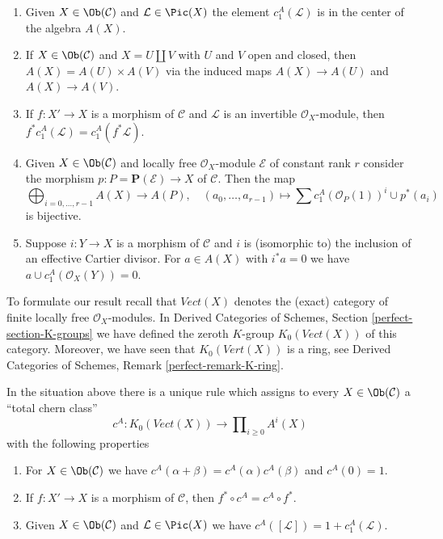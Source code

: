 \begin{enumerate}
\item Given $X \in \Ob(\mathcal{C})$ and $\mathcal{L} \in \Pic(X)$
the element $c_1^A(\mathcal{L})$ is in the center of the algebra $A(X)$.
\item If $X \in \Ob(\mathcal{C})$ and $X = U \amalg V$ with $U$ and $V$
open and closed, then $A(X) = A(U) \times A(V)$ via the induced maps
$A(X) \to A(U)$ and $A(X) \to A(V)$.
\item If $f : X' \to X$ is a morphism of $\mathcal{C}$ and $\mathcal{L}$
is an invertible $\mathcal{O}_X$-module, then $f^*c_1^A(\mathcal{L}) =
c_1^A(f^*\mathcal{L})$.
\item Given $X \in \Ob(\mathcal{C})$ and locally free $\mathcal{O}_X$-module
$\mathcal{E}$ of constant rank $r$ consider the morphism
$p : P = \mathbf{P}(\mathcal{E}) \to X$ of $\mathcal{C}$.
Then the map
$$
\bigoplus\nolimits_{i = 0, \ldots, r - 1} A(X)
\longrightarrow A(P),\quad
(a_0, \ldots, a_{r - 1}) \longmapsto
\sum c_1^A(\mathcal{O}_P(1))^i \cup p^*(a_i)
$$
is bijective.
\item Suppose $i : Y \to X$ is a morphism of $\mathcal{C}$ and $i$ is
(isomorphic to) the inclusion of an effective Cartier divisor.
For $a \in A(X)$ with $i^*a = 0$ we have $a \cup c_1^A(\mathcal{O}_X(Y)) = 0$.
\end{enumerate}
To formulate our result recall that $\textit{Vect}(X)$ denotes the
(exact) category of finite locally free $\mathcal{O}_X$-modules.
In Derived Categories of Schemes, Section \ref{perfect-section-K-groups}
we have defined the zeroth $K$-group
$K_0(\textit{Vect}(X))$ of this category.
Moreover, we have seen that $K_0(\textit{Vert}(X))$ is a ring, see
Derived Categories of Schemes, Remark \ref{perfect-remark-K-ring}.

\begin{proposition}
\label{proposition-chern-class}
In the situation above there is a unique rule which assigns to
every $X \in \Ob(\mathcal{C})$ a ``total chern class''
$$
c^A : K_0(\textit{Vect}(X)) \longrightarrow  \prod\nolimits_{i \geq 0} A^i(X)
$$
with the following properties
\begin{enumerate}
\item For $X \in \Ob(\mathcal{C})$ we have
$c^A(\alpha + \beta) = c^A(\alpha) c^A(\beta)$
and $c^A(0) = 1$.
\item If $f : X' \to X$ is a morphism of $\mathcal{C}$, then
$f^* \circ c^A =  c^A \circ f^*$.
\item Given $X \in \Ob(\mathcal{C})$ and $\mathcal{L} \in \Pic(X)$
we have $c^A([\mathcal{L}]) = 1 + c_1^A(\mathcal{L})$.
\end{enumerate}
\end{proposition}

